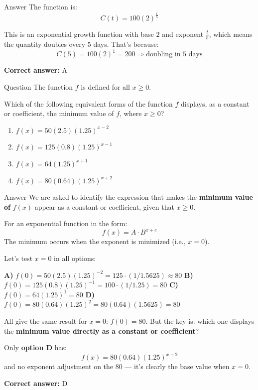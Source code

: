 \documentclass{beamer}
\begin{document}
\begin{frame}{Answer}
The function is:
\[
C(t) = 100(2)^{\frac{t}{5}}
\]

This is an exponential growth function with base $2$ and exponent $\frac{t}{5}$, which means the quantity doubles every 5 days. That’s because:
\[
C(5) = 100(2)^{1} = 200
\Rightarrow \text{doubling in 5 days}
\]

\textbf{Correct answer:} A
\end{frame}


\begin{frame}{Question}
The function $f$ is defined for all $x \geq 0$. 

Which of the following equivalent forms of the function $f$ displays, as a constant or coefficient, the minimum value of $f$, where $x \geq 0$?

\begin{enumerate}
  \item[A)] $f(x) = 50(2.5)(1.25)^{x - 2}$
  \item[B)] $f(x) = 125(0.8)(1.25)^{x - 1}$
  \item[C)] $f(x) = 64(1.25)^{x + 1}$
  \item[D)] $f(x) = 80(0.64)(1.25)^{x + 2}$
\end{enumerate}
\end{frame}



\begin{frame}{Answer}
\small
We are asked to identify the expression that makes the \textbf{minimum value of } $f(x)$ appear as a constant or coefficient, given that $x \geq 0$.

For an exponential function in the form:
\[
f(x) = A \cdot B^{x + c}
\]
The minimum occurs when the exponent is minimized (i.e., $x = 0$).

Let’s test $x = 0$ in all options:

\textbf{A)} $f(0) = 50(2.5)(1.25)^{-2} = 125 \cdot (1/1.5625) \approx 80$  
\textbf{B)} $f(0) = 125(0.8)(1.25)^{-1} = 100 \cdot (1/1.25) = 80$  
\textbf{C)} $f(0) = 64(1.25)^1 = 80$  
\textbf{D)} $f(0) = 80(0.64)(1.25)^2 = 80(0.64)(1.5625) = 80$

All give the same result for $x = 0$: $f(0) = 80$. But the key is: which one displays the \textbf{minimum value directly as a constant or coefficient}?

Only \textbf{option D} has:
\[
f(x) = \boxed{80}(0.64)(1.25)^{x + 2}
\]
and no exponent adjustment on the 80 — it’s clearly the base value when $x = 0$.

\textbf{Correct answer:} D
\end{frame}
\end{document}
